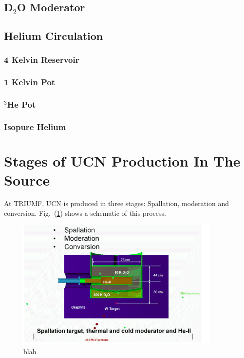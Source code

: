 \subsection{D$_2$O Moderator}

\subsection{Helium Circulation}

\subsubsection{4 Kelvin Reservoir}

\subsubsection{1 Kelvin Pot}

\subsubsection{$^3$He Pot}

\subsubsection{Isopure Helium}


\section{Stages of UCN Production In The Source}
At TRIUMF, UCN is produced in three stages: Spallation, moderation and
conversion. Fig.~(\ref{fig:ucn_production_stages}) shows a schematic of
this process.

\begin{figure}[h]
  \centering
  \includegraphics[width=0.9\textwidth]{ucn_production_stages.png}
  \caption{blah}
  \label{fig:ucn_production_stages}
\end{figure}

